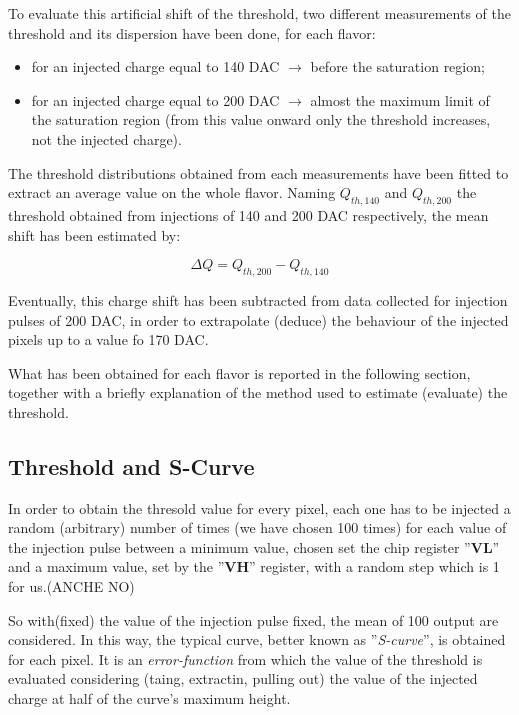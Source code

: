 To evaluate this artificial shift of the threshold, two different measurements of the threshold and its dispersion have been done, for each flavor:

\begin{itemize}
\item for an injected charge equal to 140 DAC $\rightarrow$ before the saturation region;
\item for an injected charge equal to 200 DAC $\rightarrow$ almost the maximum limit of the saturation region (from this value onward only the threshold increases, not the injected charge).
\end{itemize}

The threshold distributions obtained from each measurements have been fitted to extract an average value on the whole flavor. Naming $Q_{th, 140}$ and $Q_{th, 200}$  the threshold obtained from injections of 140 and 200 DAC respectively, the mean shift has been estimated by:

\begin{equation}
\Delta Q = Q_{th,200} - Q_{th,140}
\end{equation}

Eventually, this charge shift has been subtracted from data collected for injection pulses of 200 DAC, in order to extrapolate (deduce) the behaviour of the injected pixels up to a value fo 170 DAC.

What has been obtained for each flavor is reported in the following section, together with a briefly explanation of the method used to estimate (evaluate) the threshold.


\subsection{Threshold and S-Curve}

In order to obtain the thresold value for every pixel, each one has to be injected a random (arbitrary) number of times (we have chosen 100 times) for each value of the injection pulse between a minimum value, chosen set the chip register ''\textbf{VL}'' and a maximum value, set by the ''\textbf{VH}'' register, with a random step which is 1 for us.(ANCHE NO)

So with(fixed) the value of the injection pulse fixed, the mean of 100 output are considered. In this way, the typical curve, better known as ''\textit{S-curve}'', is obtained for each pixel. It is an \textit{error-function} from which the value of the threshold is evaluated considering (taing, extractin, pulling out) the value of the injected charge at half of the curve's maximum height.

